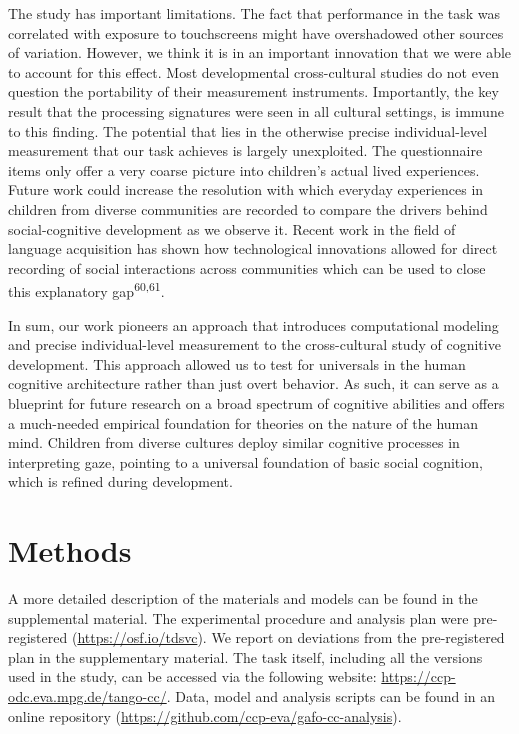 \documentclass[
  man,floatsintext]{apa6}
\begin{document}
The study has important limitations. The fact that performance in the task was correlated with exposure to touchscreens might have overshadowed other sources of variation. However, we think it is in an important innovation that we were able to account for this effect. Most developmental cross-cultural studies do not even question the portability of their measurement instruments. Importantly, the key result that the processing signatures were seen in all cultural settings, is immune to this finding. The potential that lies in the otherwise precise individual-level measurement that our task achieves is largely unexploited. The questionnaire items only offer a very coarse picture into children's actual lived experiences. Future work could increase the resolution with which everyday experiences in children from diverse communities are recorded to compare the drivers behind social-cognitive development as we observe it. Recent work in the field of language acquisition has shown how technological innovations allowed for direct recording of social interactions across communities which can be used to close this explanatory gap\textsuperscript{60,61}.

In sum, our work pioneers an approach that introduces computational modeling and precise individual-level measurement to the cross-cultural study of cognitive development. This approach allowed us to test for universals in the human cognitive architecture rather than just overt behavior. As such, it can serve as a blueprint for future research on a broad spectrum of cognitive abilities and offers a much-needed empirical foundation for theories on the nature of the human mind. Children from diverse cultures deploy similar cognitive processes in interpreting gaze, pointing to a universal foundation of basic social cognition, which is refined during development.

\hypertarget{methods}{%
\section{Methods}\label{methods}}

A more detailed description of the materials and models can be found in the supplemental material. The experimental procedure and analysis plan were pre-registered (\url{https://osf.io/tdsvc}). We report on deviations from the pre-registered plan in the supplementary material. The task itself, including all the versions used in the study, can be accessed via the following website: \url{https://ccp-odc.eva.mpg.de/tango-cc/}. Data, model and analysis scripts can be found in an online repository (\url{https://github.com/ccp-eva/gafo-cc-analysis}).
\end{document}
